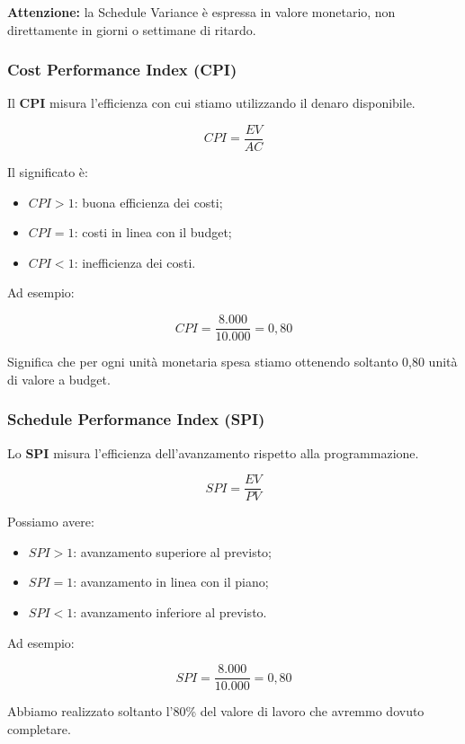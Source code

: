 \medskip

\noindent \textbf{Attenzione:} la Schedule Variance
è espressa in valore monetario,
non direttamente in giorni
o settimane di ritardo.


\subsubsection*{Cost Performance Index (CPI)}

\noindent Il \textbf{CPI} misura
l'efficienza con cui stiamo utilizzando
il denaro disponibile.

\[
\boxed{
CPI=\frac{EV}{AC}
}
\]

\noindent Il significato è:

\begin{itemize}
    \item $CPI>1$: buona efficienza dei costi;
    \item $CPI=1$: costi in linea con il budget;
    \item $CPI<1$: inefficienza dei costi.
\end{itemize}

\noindent Ad esempio:

\[
CPI=\frac{8.000}{10.000}=\boxed{0{,}80}
\]

\noindent Significa che per ogni unità
monetaria spesa stiamo ottenendo
soltanto 0,80 unità di valore a budget.


\subsubsection*{Schedule Performance Index (SPI)}

\noindent Lo \textbf{SPI} misura
l'efficienza dell'avanzamento
rispetto alla programmazione.

\[
\boxed{
SPI=\frac{EV}{PV}
}
\]

\noindent Possiamo avere:

\begin{itemize}
    \item $SPI>1$: avanzamento superiore al previsto;
    \item $SPI=1$: avanzamento in linea con il piano;
    \item $SPI<1$: avanzamento inferiore al previsto.
\end{itemize}

\noindent Ad esempio:

\[
SPI=\frac{8.000}{10.000}=\boxed{0{,}80}
\]

\noindent Abbiamo realizzato soltanto
l'80\% del valore di lavoro
che avremmo dovuto completare.



